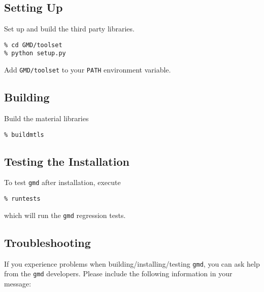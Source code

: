 \documentclass[11pt]{report}
\newcommand{\gmd}{\texttt{gmd}}
\begin{document}
\subsection{Setting Up}
Set up and build the third party libraries.
\begin{verbatim}
% cd GMD/toolset
% python setup.py
\end{verbatim}

Add \texttt{GMD/toolset} to your \texttt{PATH} environment variable.

\subsection{Building}
Build the material libraries
\begin{verbatim}
% buildmtls
\end{verbatim}

\subsection{Testing the Installation}
To test \gmd{} after installation, execute

\begin{verbatim}
% runtests
\end{verbatim}

which will run the \gmd{} regression tests.

\subsection{Troubleshooting}
If you experience problems when building/installing/testing \gmd{}, you can
ask help from the \gmd{} developers. Please include the following information
in your message:
\end{document}
